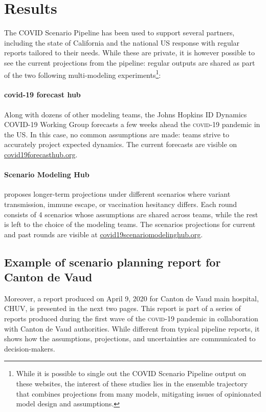 {\section{Results}
The COVID Scenario Pipeline has been used to support several partners, including the state of California and the national US response with regular reports tailored to their needs. While these are private, it is however possible to see the current projections from the pipeline: regular outputs are shared as part of the two following multi-modeling experiments\footnote{While it is possible to single out the COVID Scenario Pipeline output on these websites, the interest of these studies lies in the ensemble trajectory that combines projections from many models, mitigating issues of opinionated model design and assumptions.}:

\paragraph{covid-19 forecast hub} Along with dozens of other modeling teams, the Johns Hopkins ID Dynamics COVID-19 Working Group forecasts a few weeks ahead the \textsc{covid}-19 pandemic in the US. In this case, no common assumptions are made: teams strive to accurately project expected dynamics. The current forecasts are visible on \url{covid19forecasthub.org}\cite{Cramer:EvaluationIndividualEnsemble:2021}.

\paragraph{Scenario Modeling Hub} proposes longer-term projections under different scenarios where \eg variant transmission, immune escape, or vaccination hesitancy differs. Each round consists of 4 scenarios whose assumptions are shared across teams, while the rest is left to the choice of the modeling teams. The scenarios projections for current and past rounds are visible at \url{covid19scenariomodelinghub.org}\cite[][presents round 4 results.]{Borchering:ModelingFutureCOVID19:2021}.

\subsection{Example of scenario planning report for Canton de Vaud}
Moreover, a report produced on April 9, 2020 for Canton de Vaud main hospital, CHUV, is presented in the next two pages. This report is part of a series of reports produced during the first wave of the \textsc{covid}-19 pandemic in collaboration with Canton de Vaud authorities. While different from typical pipeline reports, it shows how the assumptions, projections, and uncertainties are communicated to decision-makers. 

}
